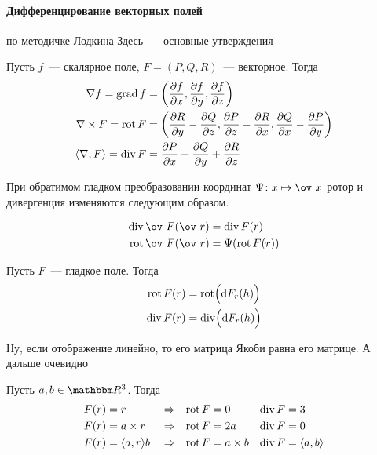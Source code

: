 \documentclass[draft,timbord]{longnotes}
\begin{document}
\paragraph{Дифференцирование векторных полей}
\label{par:dg::vecfione}

по методичке Лодкина
Здесь~--- основные утверждения

\begin{defn}\label{defn:dg::vecfione::basic}
  Пусть $f$~--- скалярное поле, $F = (P,Q,R)$~--- векторное. Тогда
  \begin{align*}
    \nabla f = \operatorname{grad} f &= \left( \frac{\partial f}{\partial x}, \frac{\partial f}{\partial y} , \frac{\partial f}{\partial z} \right) \\
    \nabla \times F = \operatorname{rot} F  &= \left( \frac{\partial R}{\partial y} - \frac{\partial Q}{\partial z}, \frac{\partial P}{\partial z} - \frac{\partial R}{\partial x} , \frac{\partial Q}{\partial x} - \frac{\partial P}{\partial y} \right) \\
    \langle \nabla, F \rangle = \operatorname{div} F  &= \frac{\partial P}{\partial x} + \frac{\partial Q}{\partial y} + \frac{\partial R}{\partial z}
  \end{align*}
\end{defn}

\begin{prop}\label{prop:dg::vecfione::form}
  При обратимом гладком преобразовании координат $\Psi \colon x \mapsto \ov~x$
  ротор и дивергенция изменяются следующим образом.

  \begin{align*}
    \div \ov~F(\ov~r) &= \div F(r) \\
    \rot \ov~F(\ov~r) &= \Psi (\rot F(r))
  \end{align*}
\end{prop}

\begin{thrm}\label{thrm:dg::vecfione::diffrules}
  Пусть $F$~--- гладкое поле. Тогда
  \[
    \begin{split}
      \operatorname{rot} F (r) &= \operatorname{rot} \Bigl(\mathrm{d} F_r(h) \Bigr) \\
      \operatorname{div} F (r) &= \operatorname{div} \Bigl(\mathrm{d} F_r(h) \Bigr)
    \end{split}
  \]
\end{thrm}
\begin{tproof}
  Ну, если отображение линейно, то его матрица Якоби равна его матрице. А дальше очевидно
\end{tproof}

\begin{thrm}\label{thrm:dg::vecfione::difftbl}
  Пусть $a, b\in \R^3$. Тогда 
  \begin{align*}
    F(r) &= r & &\Rightarrow & \operatorname{rot} F &= 0 & \operatorname{div} F &= 3\\
    F(r) &= a \times r & &\Rightarrow & \operatorname{rot} F &= 2a & \operatorname{div} F &= 0\\
    F(r) &= \langle a,r \rangle b & &\Rightarrow & \operatorname{rot} F &= a \times b & \operatorname{div} F &= \langle a,b\rangle
  \end{align*}
\end{thrm}
\end{document}
